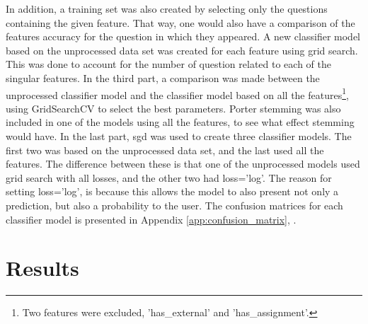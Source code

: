 In addition, a training set was also created by selecting only the questions containing the given feature.
That way, one would also have a comparison of the features accuracy for the question in which they appeared.
A new classifier model based on the unprocessed data set was created for each feature using grid search. 
This was done to account for the number of question related to each of the singular features. 
\clearpage\noindent
In the third part, a comparison was made between the unprocessed classifier model and the classifier model based on all the features\footnote{
	Two features were excluded, 'has\_external' and 'has\_assignment'.
}, using GridSearchCV to select the best parameters.
Porter stemming was also included in one of the models using all the features, to see what effect stemming would have. 
\vspace{0.5em}\newline
In the last part, \gls{sgd} was used to create three classifier models.
The first two was based on the unprocessed data set, and the last used all the features.
The difference between these is that one of the unprocessed models used grid search with all losses, and the other two had loss='log'.
The reason for setting loss='log', is because this allows the model to also present not only a prediction, but also a probability to the user.
The confusion matrices for each classifier model is presented in Appendix \ref{app:confusion_matrix}, \pageref{app:confusion_matrix}.

\section{Results}
\label{sec:results}


